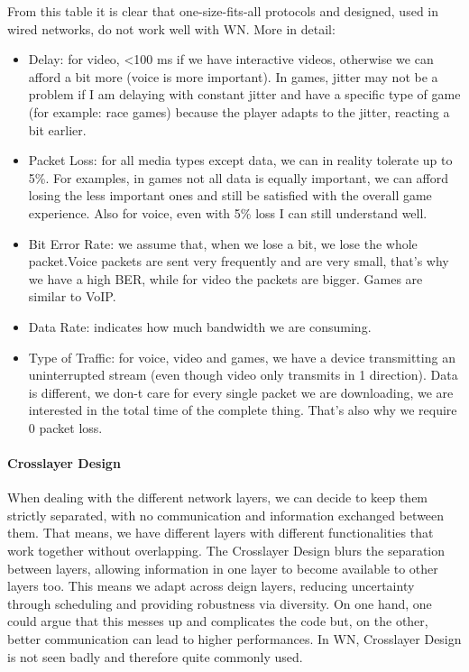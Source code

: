 From this table it is clear that one-size-fits-all protocols and 
designed, used in wired networks, do not work well with WN.
More in detail:

\begin{itemize}
\item Delay: for video, \textless100 ms if we have interactive 
  videos, otherwise we can afford a bit more (voice is more important).
  In games, jitter may not be a problem if I am delaying with 
  constant jitter and have a specific type of game (for example: race games) 
  because the player adapts to the jitter, reacting a bit earlier.
\item Packet Loss: for all media types except data, we can in 
  reality tolerate up to 5\%. For examples, in games not all data is equally 
  important, we can afford losing the less important ones and still be satisfied 
  with the overall game experience. Also for voice, even with 5\% loss I can
  still understand well.
\item Bit Error Rate: we assume that, when we lose a bit, we 
  lose the whole packet.Voice packets are sent very frequently and are very
  small, that's why we have a high BER, while for video the packets are bigger.
  Games are similar to VoIP.
\item Data Rate: indicates how much bandwidth we are consuming.
\item Type of Traffic: for voice, video and games, we have a 
  device transmitting an uninterrupted stream (even though video only transmits
  in 1 direction). Data is different, we don-t care for every single packet we
  are downloading, we are interested in the total time of the complete thing.
  That's also why we require 0 packet loss. 
\end{itemize}

\paragraph*{Crosslayer Design} When dealing with the different network 
layers, we can decide to keep them strictly separated, with no communication and 
information exchanged between them. That means, we have different layers with 
different functionalities that work together without overlapping. The Crosslayer 
Design blurs the separation between layers, allowing information in one layer to 
become available to other layers too. This means we adapt across deign layers, 
reducing uncertainty through scheduling and providing robustness via diversity.
On one hand, one could argue that this messes up and complicates the 
code but, on the other, better communication can lead to higher performances. In 
WN, Crosslayer Design is not seen badly and therefore quite commonly used.

